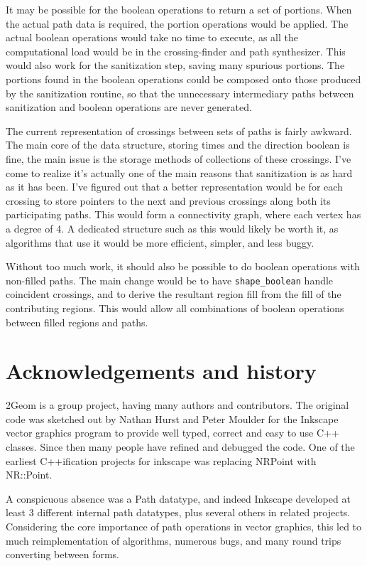 \documentclass[openany]{book}
\begin{document}
It may be possible for the boolean operations to return a set of portions. When the actual path data is required, the portion operations would be applied. The actual boolean operations would take no time to execute, as all the computational load would be in the crossing-finder and path synthesizer. This would also work for the sanitization step, saving many spurious portions. The portions found in the boolean operations could be composed onto those produced by the sanitization routine, so that the unnecessary intermediary paths between sanitization and boolean operations are never generated.

The current representation of crossings between sets of paths is fairly awkward. The main core of the data structure, storing times and the direction boolean is fine, the main issue is the storage methods of collections of these crossings. I've come to realize it's actually one of the main reasons that sanitization is as hard as it has been. I've figured out that a better representation would be for each crossing to store pointers to the next and previous crossings along both its participating paths. This would form a connectivity graph, where each vertex has a degree of 4. A dedicated structure such as this would likely be worth it, as algorithms that use it would be more efficient, simpler, and less buggy.

Without too much work, it should also be possible to do boolean operations with non-filled paths. The main change would be to have \verb|shape_boolean| handle coincident crossings, and to derive the resultant region fill from the fill of the contributing regions. This would allow all combinations of boolean operations between filled regions and paths. 

\chapter{Acknowledgements and history}

2Geom is a group project, having many authors and contributors.  The
original code was sketched out by Nathan Hurst and Peter Moulder for
the Inkscape vector graphics program to provide well typed, correct
and easy to use C++ classes.  Since then many people have refined and
debugged the code.  One of the earliest C++ification projects for
inkscape was replacing NRPoint with NR::Point.

A conspicuous absence was a Path datatype, and indeed Inkscape
developed at least 3 different internal path datatypes, plus several
others in related projects.  Considering the core importance of path
operations in vector graphics, this led to much reimplementation of
algorithms, numerous bugs, and many round trips converting between
forms.
\end{document}
